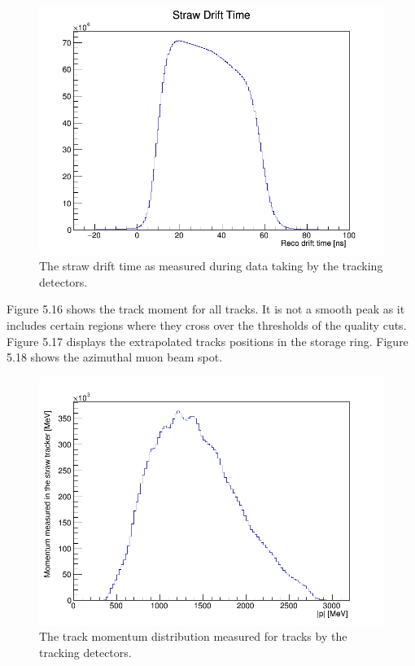 \begin{figure}[th]
\centering
\includegraphics[scale=0.4]{Figures/StrawDriftTime_.png}
\decoRule
\caption{The straw drift time as measured during data taking by the tracking detectors.}
\label{fig:StrawDriftTime_}
\end{figure}

Figure 5.16 shows the track moment for all tracks. It is not a smooth peak as it includes certain regions where they cross over the thresholds of the quality cuts. Figure 5.17 displays the extrapolated tracks positions in the storage ring. Figure 5.18 shows the azimuthal muon beam spot.

\begin{figure}[th]
\centering
\includegraphics[scale=0.4]{Figures/hMomentum_.png}
\decoRule
\caption{The track momentum distribution measured for tracks by the tracking detectors.}
\label{fig:hMomentum_}
\end{figure}

